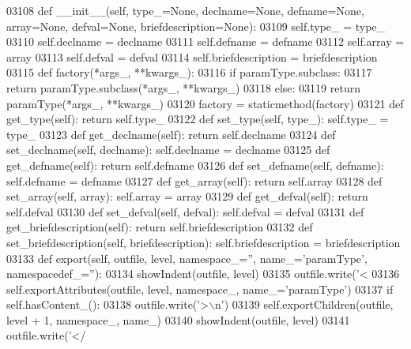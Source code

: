 \begin{DoxyCode}
{{{{{{{{{{{{{{{{{{{{{{{{{{{{{{{{{{{{{{{{{{{{{{{{{{{{{{{{{{{{{{{{{{{{{{{{{{{{{{{{{{{{{{{{{{{{{{{{{{{{{{{{{{{{{{{{{{{{{{{{{{{{{{{{{{{{{{{{{{{{{{{{{{{{{{{{{{{{{{{{{{{{{{{{{{{{{{{{{{{{{{{{{{{{{{{{{{{{{{{{{{{{{03108     \textcolor{keyword}{def }__init__(self, type\_=None, declname=None, defname=None, array=None, defval=None, 
      briefdescription=None):
03109         self.type_ = type\_
03110         self.declname = declname
03111         self.defname = defname
03112         self.array = array
03113         self.defval = defval
03114         self.briefdescription = briefdescription
03115     \textcolor{keyword}{def }factory(*args\_, **kwargs\_):
03116         \textcolor{keywordflow}{if} paramType.subclass:
03117             \textcolor{keywordflow}{return} paramType.subclass(*args\_, **kwargs\_)
03118         \textcolor{keywordflow}{else}:
03119             \textcolor{keywordflow}{return} paramType(*args\_, **kwargs\_)
03120     factory = staticmethod(factory)
03121     \textcolor{keyword}{def }get_type(self): \textcolor{keywordflow}{return} self.type\_
03122     \textcolor{keyword}{def }set_type(self, type\_): self.type\_ = type\_
03123     \textcolor{keyword}{def }get_declname(self): \textcolor{keywordflow}{return} self.declname
03124     \textcolor{keyword}{def }set_declname(self, declname): self.declname = declname
03125     \textcolor{keyword}{def }get_defname(self): \textcolor{keywordflow}{return} self.defname
03126     \textcolor{keyword}{def }set_defname(self, defname): self.defname = defname
03127     \textcolor{keyword}{def }get_array(self): \textcolor{keywordflow}{return} self.array
03128     \textcolor{keyword}{def }set_array(self, array): self.array = array
03129     \textcolor{keyword}{def }get_defval(self): \textcolor{keywordflow}{return} self.defval
03130     \textcolor{keyword}{def }set_defval(self, defval): self.defval = defval
03131     \textcolor{keyword}{def }get_briefdescription(self): \textcolor{keywordflow}{return} self.briefdescription
03132     \textcolor{keyword}{def }set_briefdescription(self, briefdescription): self.briefdescription = briefdescription
03133     \textcolor{keyword}{def }export(self, outfile, level, namespace\_='', name\_='paramType', namespacedef\_=''):
03134         showIndent(outfile, level)
03135         outfile.write(\textcolor{stringliteral}{'<%
03136         self.exportAttributes(outfile, level, namespace\_, name\_=\textcolor{stringliteral}{'paramType'})
03137         \textcolor{keywordflow}{if} self.hasContent_():
03138             outfile.write(\textcolor{stringliteral}{'>\(\backslash\)n'})
03139             self.exportChildren(outfile, level + 1, namespace\_, name\_)
03140             showIndent(outfile, level)
03141             outfile.write(\textcolor{stringliteral}{'</%
}}}}}}}}}}}}}}}}}}}}}}}}}}}}}}}}}}}}}}}}}}}}}}}}}}}}}}}}}}}}}}}}}}}}}}}}}}}}}}}}}}}}}}}}}}}}}}}}}}}}}}}}}}}}}}}}}}}}}}}}}}}}}}}}}}}}}}}}}}}}}}}}}}}}}}}}}}}}}}}}}}}}}}}}}}}}}}}}}}}}}}}}}}}}}}}}}}}}}}}}}}}}}}}
\end{DoxyCode}

